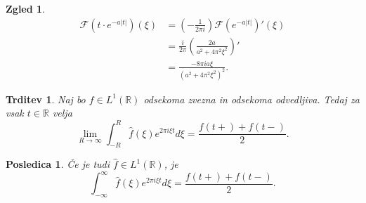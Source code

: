 \documentclass[10pt, a4paper]{article}
\newtheorem{posledica}[izr]{Posledica}
\newtheorem{trditev}[izr]{Trditev}
\newtheorem{zgled}{Zgled}[section]
\newcommand{\R}{\mathbb {R}}
\newcommand{\F}{\mathcal{F}}
\begin{document}
\begin{zgled}
    \begin{align*}
        \F (t \cdot e^{-a|t|}) (\xi) &= \left(-\frac{1}{2 \pi i}\right) \F (e^{-a|t|}) ' (\xi)\\
        &= \frac{i}{2 \pi} \left(\frac{2a}{a^2 + 4 \pi^2 \xi^2}\right)'\\
        &= \frac{-8 \pi i a \xi}{(a^2 + 4\pi^2 \xi^2)^2}.
    \end{align*}
\end{zgled}

\begin{trditev}
    Naj bo $f \in L^1 (\R)$ odsekoma zvezna in odsekoma odvedljiva.
    Tedaj za vsak $t \in \R$ velja 
    $$\lim_{R \to \infty} \int_{-R} ^R \hat{f} (\xi) e^{2 \pi i\xi t} d\xi = \frac{f(t+) + f(t-)}{2}.$$
\end{trditev}

\begin{posledica}
    Če je tudi $\hat{f} \in L^1 (\R)$, je 
    $$\int_{-\infty} ^\infty \hat{f} (\xi) e^{2 \pi i\xi t} d\xi = \frac{f(t+) + f(t-)}{2}.$$
\end{posledica}
\end{document}
